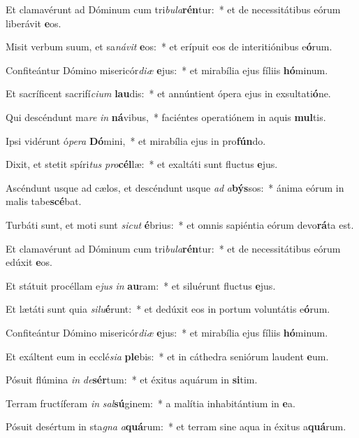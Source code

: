 \item Et clamavérunt ad Dóminum cum tri\textit{bu}\textit{la}\textbf{rén}tur:~* et de necessitátibus eórum liberávit \textbf{e}os.
\item Misit verbum suum, et sa\textit{ná}\textit{vit} \textbf{e}os:~* et erípuit eos de interitiónibus e\textbf{ó}rum.
\item Confiteántur Dómino misericór\textit{di}\textit{æ} \textbf{e}jus:~* et mirabília ejus fíliis \textbf{hó}minum.
\item Et sacríficent sacrifí\textit{ci}\textit{um} \textbf{lau}dis:~* et annúntient ópera ejus in exsultati\textbf{ó}ne.
\item Qui descéndunt ma\textit{re} \textit{in} \textbf{ná}vibus,~* faciéntes operatiónem in aquis \textbf{mul}tis.
\item Ipsi vidérunt ó\textit{pe}\textit{ra} \textbf{Dó}mini,~* et mirabília ejus in pro\textbf{fún}do.
\item Dixit, et stetit spíri\textit{tus} \textit{pro}\textbf{cél}læ:~* et exaltáti sunt fluctus \textbf{e}jus.
\item Ascéndunt usque ad cælos, et descéndunt usque \textit{ad} \textit{a}\textbf{býs}sos:~* ánima eórum in malis tabe\textbf{scé}bat.
\item Turbáti sunt, et moti sunt \textit{sic}\textit{ut} \textbf{é}brius:~* et omnis sapiéntia eórum devo\textbf{rá}ta est.
\item Et clamavérunt ad Dóminum cum tri\textit{bu}\textit{la}\textbf{rén}tur:~* et de necessitátibus eórum edúxit \textbf{e}os.
\item Et státuit procéllam e\textit{jus} \textit{in} \textbf{au}ram:~* et siluérunt fluctus \textbf{e}jus.
\item Et lætáti sunt quia \textit{si}\textit{lu}\textbf{é}runt:~* et dedúxit eos in portum voluntátis e\textbf{ó}rum.
\item Confiteántur Dómino misericór\textit{di}\textit{æ} \textbf{e}jus:~* et mirabília ejus fíliis \textbf{hó}minum.
\item Et exáltent eum in ecclé\textit{si}\textit{a} \textbf{ple}bis:~* et in cáthedra seniórum laudent \textbf{e}um.
\item Pósuit flúmina \textit{in} \textit{de}\textbf{sér}tum:~* et éxitus aquárum in \textbf{si}tim.
\item Terram fructíferam \textit{in} \textit{sal}\textbf{sú}ginem:~* a malítia inhabitántium in \textbf{e}a.
\item Pósuit desértum in sta\textit{gna} \textit{a}\textbf{quá}rum:~* et terram sine aqua in éxitus a\textbf{quá}rum.
